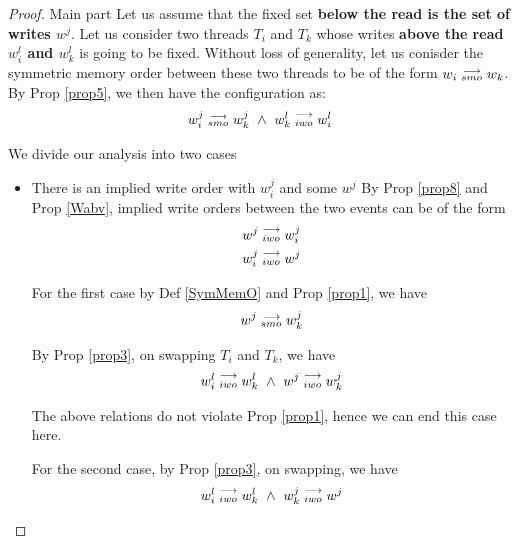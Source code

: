 \begin{proof}{Main part}
                Let us assume that the fixed set \textbf{below the read is the set of writes $w^j$}. Let us consider two threads $T_i$ and $T_k$ whose writes \textbf{above the read $w_i^l$ and $w_k^l$} is going to be fixed. Without loss of generality, let us conisder the symmetric memory order between these two threads to be of the form $w_i\stackrel{\longrightarrow}{_{smo}}w_k$.  By Prop \ref{prop5}, we then have the configuration as:
                \begin{align*}
                    \reln{w_i^j}{smo}{w_k^j} \ \wedge \ \reln{w_k^l}{iwo}{w_i^l}
                \end{align*}

                We divide our analysis into two cases 
                \begin{itemize}
                    \item There is an implied write order with $w_i^j$ and some $w^j$
                        By Prop \ref{prop8} and Prop \ref{Wabv}, implied write orders between the two events can be of the form 
                        \begin{align*}
                            w^j\stackrel{\longrightarrow}{_{iwo}}w_i^j \\
                            w_i^j\stackrel{\longrightarrow}{_{iwo}}w^j 
                        \end{align*}

                        For the first case by Def \ref{SymMemO} and Prop \ref{prop1}, we have
                        \begin{align*}
                            w^j\stackrel{\longrightarrow}{_{smo}}w_k^j
                        \end{align*}

                        By Prop \ref{prop3}, on swapping $T_i$ and $T_k$, we have 
                        \begin{align*}
                            \reln{w_i^l}{iwo}{w_k^l} \ \wedge \ \reln{w^j}{iwo}{w_k^j}
                        \end{align*}

                        The above relations do not violate Prop \ref{prop1}, hence we can end this case here. 

                        For the second case, by Prop \ref{prop3}, on swapping, we have 
                        \begin{align*}
                            \reln{w_i^l}{iwo}{w_k^l} \ \wedge \ \reln{w_k^j}{iwo}{w^j}
                        \end{align*}


\end{itemize}
\end{proof}
